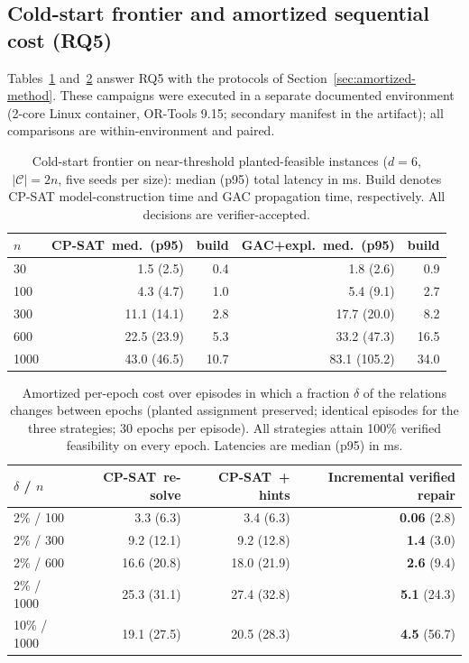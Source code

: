 \documentclass[pdflatex,sn-mathphys-num,iicol,oneside]{sn-jnl}
\newcommand{\cpsat}{\textsc{CP-SAT}}
\begin{document}
\subsection{Cold-start frontier and amortized sequential cost (RQ5)}
\label{sec:amortized-results}

Tables~\ref{tab:coldstart} and~\ref{tab:amortized} answer RQ5 with the
protocols of Section~\ref{sec:amortized-method}. These campaigns were
executed in a separate documented environment (2-core Linux container,
OR-Tools 9.15; secondary manifest in the artifact); all comparisons are
within-environment and paired.

\begin{table}[t]
\centering
\caption{Cold-start frontier on near-threshold planted-feasible
instances ($d=6$, $|\mathcal{C}|=2n$, five seeds per size): median
(p95) total latency in ms. Build denotes CP-SAT model-construction
time and GAC propagation time, respectively. All decisions are
verifier-accepted.}
\label{tab:coldstart}
\setlength{\tabcolsep}{3pt}\small
\begin{tabular}{lrrrr}
\toprule
$n$ & \cpsat\ med.\ (p95) & build & GAC+expl.\ med.\ (p95) & build\\
\midrule
30 & 1.5 (2.5) & 0.4 & 1.8 (2.6) & 0.9\\
100 & 4.3 (4.7) & 1.0 & 5.4 (9.1) & 2.7\\
300 & 11.1 (14.1) & 2.8 & 17.7 (20.0) & 8.2\\
600 & 22.5 (23.9) & 5.3 & 33.2 (47.3) & 16.5\\
1000 & 43.0 (46.5) & 10.7 & 83.1 (105.2) & 34.0\\
\bottomrule
\end{tabular}
\normalsize
\end{table}

\begin{table}[t]
\centering
\caption{Amortized per-epoch cost over episodes in which a fraction
$\delta$ of the relations changes between epochs (planted assignment
preserved; identical episodes for the three strategies; 30 epochs per
episode). All strategies attain 100\% verified feasibility on every
epoch. Latencies are median (p95) in ms.}
\label{tab:amortized}
\setlength{\tabcolsep}{4pt}\small
\begin{tabular}{lrrr}
\toprule
$\delta$ / $n$ & \cpsat\ re-solve & \cpsat\ + hints &
Incremental verified repair\\
\midrule
2\% / 100 & 3.3 (6.3) & 3.4 (6.3) & \textbf{0.06} (2.8)\\
2\% / 300 & 9.2 (12.1) & 9.2 (12.8) & \textbf{1.4} (3.0)\\
2\% / 600 & 16.6 (20.8) & 18.0 (21.9) & \textbf{2.6} (9.4)\\
2\% / 1000 & 25.3 (31.1) & 27.4 (32.8) & \textbf{5.1} (24.3)\\
10\% / 1000 & 19.1 (27.5) & 20.5 (28.3) & \textbf{4.5} (56.7)\\
\bottomrule
\end{tabular}
\normalsize
\end{table}
\end{document}
